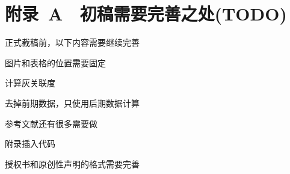 ﻿%

\chapter*{\hfill 附录~A　初稿需要完善之处(TODO) \hfill}

正式截稿前，以下内容需要继续完善

\begin{asparaenum}
\item 图片和表格的位置需要固定
\item 计算灰关联度
\item 去掉前期数据，只使用后期数据计算
\item 参考文献还有很多需要做
\item 附录插入代码
\item 授权书和原创性声明的格式需要完善
\end{asparaenum}



